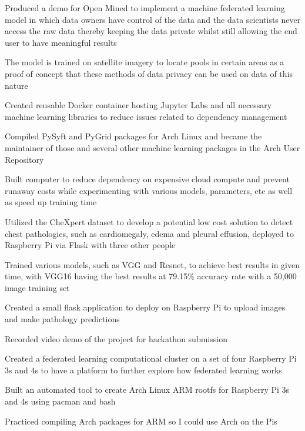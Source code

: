 \documentclass[letterpaper]{resume}
\begin{document}
\begin{compactitem}
\item Produced a demo for Open Mined to implement a machine federated learning model in which data owners have control of the data and the data scientists never access the raw data thereby keeping the data private whilst still allowing the end user to have meaningful results
\item The model is trained on satellite imagery to locate pools in certain areas as a proof of concept that these methods of data privacy can be used on data of this nature
\item Created reusable Docker container hosting Jupyter Labs and all necessary machine learning libraries to reduce issues related to dependency management
\item Compiled PySyft and PyGrid packages for Arch Linux and became the maintainer of those and several other machine learning packages in the Arch User Repository
\item Built computer to reduce dependency on expensive cloud compute and prevent runaway costs while experimenting with various models, parameters, etc as well as speed up training time
\end{compactitem}

\begin{compactitem}
\item Utilized the CheXpert dataset to develop a potential low cost solution to detect chest pathologies, such as cardiomegaly, edema and pleural effusion, deployed to Raspberry Pi via Flask with three other people
\item Trained various models, such as VGG and Resnet, to achieve best results in given time, with VGG16 having the best results at 79.15\% accuracy rate with a 50,000 image training set
\item Created a small flask application to deploy on Raspberry Pi to upload images and make pathology predictions
\item Recorded video demo of the project for hackathon submission
\end{compactitem}


\begin{compactitem}
\item Created a federated learning computational cluster on a set of four Raspberry Pi 3s and 4s to have a platform to further explore how federated learning works
\item Built an automated tool to create Arch Linux ARM rootfs for Raspberry Pi 3s and 4s using pacman and bash
\item Practiced compiling Arch packages for ARM so I could use Arch on the Pis
\end{compactitem}
 
\end{document}
